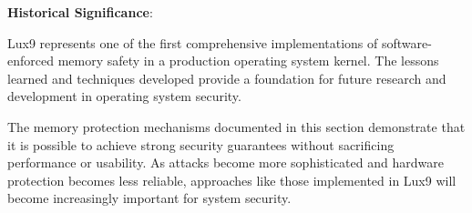 \documentclass[11pt,letterpaper]{article}
\begin{document}
\textbf{Historical Significance}:

Lux9 represents one of the first comprehensive implementations of software-enforced memory safety in a production operating system kernel. The lessons learned and techniques developed provide a foundation for future research and development in operating system security.

The memory protection mechanisms documented in this section demonstrate that it is possible to achieve strong security guarantees without sacrificing performance or usability. As attacks become more sophisticated and hardware protection becomes less reliable, approaches like those implemented in Lux9 will become increasingly important for system security.
\end{document}
